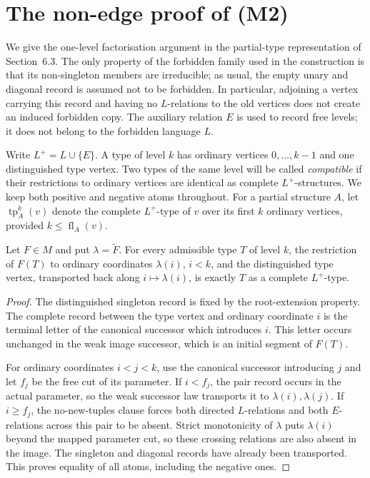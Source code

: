 
\section{The non-edge proof of (M2)}\label{app:m2-nonedge}

We give the one-level factorisation argument in the partial-type
representation of Section~6.3.  The only property of the forbidden
family used in the construction is that its non-singleton members are
irreducible; as usual, the empty unary and diagonal record is assumed
not to be forbidden.  In particular, adjoining a vertex carrying this
record and having no $L$-relations to the old vertices does not create
an induced forbidden copy.  The auxiliary relation $E$ is used to
record free levels; it does not belong to the forbidden language $L$.

Write $L^+=L\cup\{E\}$.  A type of level $k$ has ordinary vertices
$0,\ldots,k-1$ and one distinguished type vertex.  Two types of the
same level will be called \emph{compatible} if their restrictions to
ordinary vertices are identical as complete $L^+$-structures.  We
keep both positive and negative atoms throughout.  For a partial
structure $A$, let $\operatorname{tp}^k_A(v)$ denote the complete
$L^+$-type of $v$ over its first $k$ ordinary vertices, provided
$k\leq\operatorname{fl}_A(v)$.

\begin{lemma}\label{lem:m2-retained-record}
Let $F\in M$ and put $\lambda=\widetilde F$.  For every admissible
type $T$ of level $k$, the restriction of $F(T)$ to ordinary
coordinates $\lambda(i)$, $i<k$, and the distinguished type vertex,
transported back along $i\mapsto\lambda(i)$, is exactly $T$ as a
complete $L^+$-type.
\end{lemma}
\begin{proof}
The distinguished singleton record is fixed by the root-extension
property.  The complete record between the type vertex and ordinary
coordinate $i$ is the terminal letter of the canonical successor
which introduces $i$.  This letter occurs unchanged in the weak
image successor, which is an initial segment of $F(T)$.

For ordinary coordinates $i<j<k$, use the canonical successor
introducing $j$ and let $f_j$ be the free cut of its parameter.  If
$i<f_j$, the pair record occurs in the actual parameter, so the weak
successor law transports it to $\lambda(i),\lambda(j)$.  If
$i\geq f_j$, the no-new-tuples clause forces both directed
$L$-relations and both $E$-relations across this pair to be absent.
Strict monotonicity of $\lambda$ puts $\lambda(i)$ beyond the mapped
parameter cut, so these crossing relations are also absent in the
image.  The singleton and diagonal records have already been
transported.  This proves equality of all atoms, including the
negative ones.
\end{proof}

